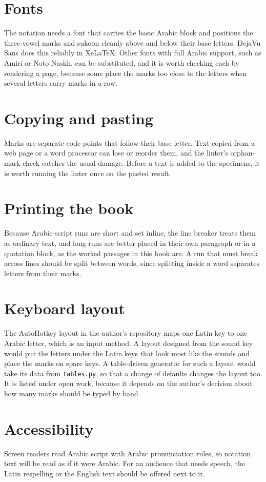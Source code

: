 \section{Fonts}
The notation needs a font that carries the basic Arabic block and positions the three vowel marks and sukoon cleanly above and below their base letters. DejaVu Sans does this reliably in XeLaTeX. Other fonts with full Arabic support, such as Amiri or Noto Naskh, can be substituted, and it is worth checking each by rendering a page, because some place the marks too close to the letters when several letters carry marks in a row.

\section{Copying and pasting}
Marks are separate code points that follow their base letter. Text copied from a web page or a word processor can lose or reorder them, and the linter's orphan-mark check catches the usual damage. Before a text is added to the specimens, it is worth running the linter once on the pasted result.

\section{Printing the book}
Because Arabic-script runs are short and set inline, the line breaker treats them as ordinary text, and long runs are better placed in their own paragraph or in a quotation block, as the worked passages in this book are. A run that must break across lines should be split between words, since splitting inside a word separates letters from their marks.

\section{Keyboard layout}
The AutoHotkey layout in the author's repository maps one Latin key to one Arabic letter, which is an input method. A layout designed from the sound key would put the letters under the Latin keys that look most like the sounds and place the marks on spare keys. A table-driven generator for such a layout would take its data from \texttt{tables.py}, so that a change of defaults changes the layout too. It is listed under open work, because it depends on the author's decision about how many marks should be typed by hand.

\section{Accessibility}
Screen readers read Arabic script with Arabic pronunciation rules, so notation text will be read as if it were Arabic. For an audience that needs speech, the Latin respelling or the English text should be offered next to it.
